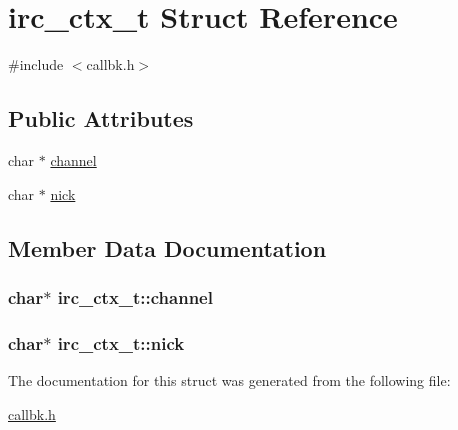 \hypertarget{structirc__ctx__t}{\section{irc\-\_\-ctx\-\_\-t \-Struct \-Reference}
\label{structirc__ctx__t}
}


{\ttfamily \#include $<$callbk.\-h$>$}

\subsection*{\-Public \-Attributes}
\begin{DoxyCompactItemize}
\item 
char $\ast$ \hyperlink{structirc__ctx__t_adab1f1a75877f72917167b372f546db9}{channel}
\item 
char $\ast$ \hyperlink{structirc__ctx__t_ab2ad2d142339cd2dbf30542193326757}{nick}
\end{DoxyCompactItemize}


\subsection{\-Member \-Data \-Documentation}
\hypertarget{structirc__ctx__t_adab1f1a75877f72917167b372f546db9}{
\subsubsection[{channel}]{\setlength{\rightskip}{0pt plus 5cm}char$\ast$ {\bf irc\-\_\-ctx\-\_\-t\-::channel}}}\label{structirc__ctx__t_adab1f1a75877f72917167b372f546db9}
\hypertarget{structirc__ctx__t_ab2ad2d142339cd2dbf30542193326757}{
\subsubsection[{nick}]{\setlength{\rightskip}{0pt plus 5cm}char$\ast$ {\bf irc\-\_\-ctx\-\_\-t\-::nick}}}\label{structirc__ctx__t_ab2ad2d142339cd2dbf30542193326757}


\-The documentation for this struct was generated from the following file\-:\begin{DoxyCompactItemize}
\item 
\hyperlink{callbk_8h}{callbk.\-h}\end{DoxyCompactItemize}
